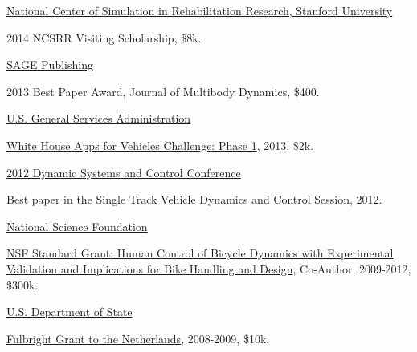 \documentclass[10pt]{article}
\newenvironment{innerlist}[1][\enskip\textbullet]%
        {\begin{compactitem}[#1]}{\end{compactitem}}
\newcommand{\blankline}{\quad\pagebreak[2]}
\begin{document}
\begin{innerlist}
\blankline

\href{http://opensim.stanford.edu/}{National Center of Simulation in
  Rehabilitation Research, Stanford University}
\begin{innerlist}
  \item 2014 NCSRR Visiting Scholarship, \$8k.
\end{innerlist}

\blankline

\href{http://sagepub.com/}{SAGE Publishing}
\begin{innerlist}
  \item 2013 Best Paper Award, Journal of Multibody Dynamics, \$400.
\end{innerlist}

\blankline

\href{http://gsa.gov/}{U.S. General Services Administration}
\begin{innerlist}
  \item \href{http://appsforvehicles.challenge.gov/}{White House Apps for
    Vehicles Challenge: Phase 1}, 2013, \$2k.
\end{innerlist}

\blankline

\href{http://mne.psu.edu/dscc2012/}{2012 Dynamic Systems and Control Conference}
\begin{innerlist}
  \item Best paper in the Single Track Vehicle Dynamics and Control Session,
    2012.
\end{innerlist}

\blankline

\href{http://nsf.gov/}{National Science Foundation}
\begin{innerlist}
  \item \href{http://nsf.gov/awardsearch/showAward.do?AwardNumber=0928339}{NSF
    Standard Grant: Human Control of Bicycle Dynamics with Experimental
    Validation and Implications for Bike Handling and Design}, Co-Author,
    2009-2012, \$300k.
\end{innerlist}

\blankline

\href{http://exchanges.state.gov/}{U.S. Department of State}
\begin{innerlist}
  \item \href{http://fulbright.state.gov/}{Fulbright Grant to the Netherlands},
    2008-2009, \$10k.
\end{innerlist}

\blankline


\end{innerlist}
\end{document}
